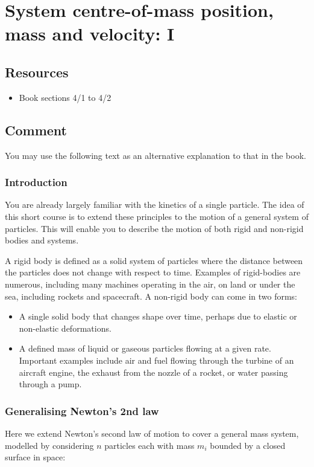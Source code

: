 \newpage
\section{System centre-of-mass position, mass and velocity: I}

\subsection*{Resources}
\begin{itemize}
    \item Book sections 4/1 to 4/2
\end{itemize}


\subsection*{Comment}
You may use the following text as an alternative explanation to that in the book.

\subsubsection{Introduction}
You are already largely familiar with the kinetics of a single particle.
The idea of this short course is to extend these principles to the motion of a general system of particles.
This will enable you to describe the motion of both rigid and non-rigid bodies and systems.

A rigid body is defined as a solid system of particles where the distance between the particles does not change with respect to time.
Examples of rigid-bodies are numerous, including many machines operating in the air, on land or under the sea, including rockets and spacecraft.
A non-rigid body can come in two forms:
\begin{itemize}
    \item A single solid body that changes shape over time, perhaps due to elastic or non-elastic deformations.
    \item A defined mass of liquid or gaseous particles flowing at a given rate. Important examples include air and fuel flowing through the turbine of an aircraft engine, the exhaust from the nozzle of a rocket, or water passing through a pump.
\end{itemize}

\subsubsection{Generalising Newton's 2nd law}
Here we extend Newton's second law of motion to cover a general mass system, modelled by considering $n$ particles each with mass $m_i$ bounded by a closed surface in space:

